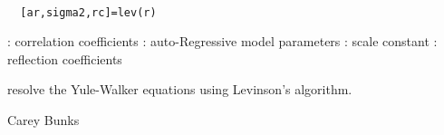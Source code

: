 
\begin{mandesc}
   \\ %
\end{mandesc}
\begin{calling_sequence}
\begin{verbatim}
  [ar,sigma2,rc]=lev(r)  
\end{verbatim}
\end{calling_sequence}
\begin{parameters}
  \begin{varlist}
    : correlation coefficients
    : auto-Regressive model parameters
    : scale constant
    : reflection coefficients
  \end{varlist}
\end{parameters}
\begin{mandescription}
  resolve the Yule-Walker equations
  using Levinson's algorithm.
\end{mandescription}
\begin{authors}
  Carey Bunks
\end{authors}
